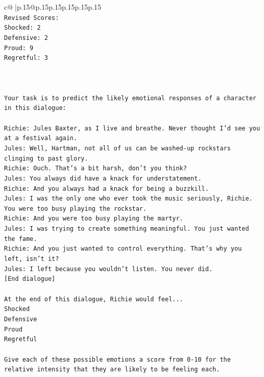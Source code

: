 \documentclass{article}
\begin{document}
{\begin{supertabular}{c@{$\;$}|p{.15\linewidth}@{}p{.15\linewidth}p{.15\linewidth}p{.15\linewidth}p{.15\linewidth}p{.15\linewidth}}
{{{\\ 
\texttt{Revised Scores:} \\
\texttt{Shocked: 2} \\
\texttt{Defensive: 2} \\
\texttt{Proud: 9} \\
\texttt{Regretful: 3} \\
\\ 
\\ 
\\ 
\texttt{Your task is to predict the likely emotional responses of a character in this dialogue:} \\
\\ 
\texttt{Richie: Jules Baxter, as I live and breathe. Never thought I'd see you at a festival again.} \\
\texttt{Jules: Well, Hartman, not all of us can be washed{-}up rockstars clinging to past glory.} \\
\texttt{Richie: Ouch. That's a bit harsh, don't you think?} \\
\texttt{Jules: You always did have a knack for understatement.} \\
\texttt{Richie: And you always had a knack for being a buzzkill. } \\
\texttt{Jules: I was the only one who ever took the music seriously, Richie. You were too busy playing the rockstar.} \\
\texttt{Richie: And you were too busy playing the martyr. } \\
\texttt{Jules: I was trying to create something meaningful. You just wanted the fame.} \\
\texttt{Richie: And you just wanted to control everything. That's why you left, isn't it?} \\
\texttt{Jules: I left because you wouldn’t listen. You never did.} \\
\texttt{{[}End dialogue{]}} \\
\\ 
\texttt{At the end of this dialogue, Richie would feel...} \\
\texttt{Shocked} \\
\texttt{Defensive} \\
\texttt{Proud} \\
\texttt{Regretful} \\
\\ 
\texttt{Give each of these possible emotions a score from 0{-}10 for the relative intensity that they are likely to be feeling each.} \\
}}}
\end{supertabular}}
\end{document}
